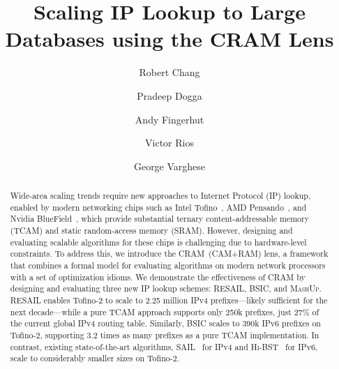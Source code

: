 \documentclass[letterpaper,twocolumn,10pt]{article}
\newcommand{\mashup}{\textsc{MashUp}\xspace}
\newcommand{\bsic}{\textsc{BSIC}\xspace}
\newcommand{\resail}{\textsc{RESAIL}\xspace}
\newcommand{\sail}{\textsc{SAIL}\xspace}
\newcommand{\hibst}{\textsc{Hi-BST}\xspace}
\newcommand{\cram}{\textsc{CRAM}\xspace}
\begin{document}

\date{}

\title{\vspace{-7em}\Large \bf Scaling IP Lookup to Large Databases using the CRAM Lens\vspace{-1em}}

\makeatletter
\renewcommand\AB@affilsepx{\quad\qquad\protect\Affilfont}
\makeatother
\setlength{\affilsep}{0.8em}
\renewcommand\Affilfont{\itshape}
\renewcommand\Authands{\qquad}
\renewcommand\Authsep{\qquad}
\author[1]{Robert Chang}
\author[1]{Pradeep Dogga}
\author[2]{Andy Fingerhut}
\author[1]{Victor Rios}
\author[1]{George Varghese}

\maketitle


\begin{abstract}

Wide-area scaling trends require new approaches to Internet Protocol (IP) lookup, enabled by modern networking chips such as Intel Tofino~\cite{intel_tofino}, AMD Pensando~\cite{amd_pensando}, and Nvidia BlueField~\cite{nvidia_bluefield}, which provide substantial ternary content-addressable memory (TCAM) and static random-access memory (SRAM). However, designing and evaluating scalable algorithms for these chips is challenging due to hardware-level constraints. To address this, we introduce the \cram~(CAM+RAM) lens, a framework that combines a formal model for evaluating algorithms on modern network processors with a set of optimization idioms. We demonstrate the effectiveness of \cram by designing and evaluating three new IP lookup schemes: \resail, \bsic, and \mashup. \resail enables Tofino-2 to scale to 2.25 million IPv4 prefixes---likely sufficient for the next decade---while a pure TCAM approach supports only 250k prefixes, just 27\% of the current global IPv4 routing table. Similarly, \bsic scales to 390k IPv6 prefixes on Tofino-2, supporting 3.2 times as many prefixes as a pure TCAM implementation. In contrast, existing state-of-the-art algorithms, \sail~\cite{sail} for IPv4 and \hibst~\cite{hibst} for IPv6, scale to considerably smaller sizes on Tofino-2.

\end{abstract}
\end{document}
